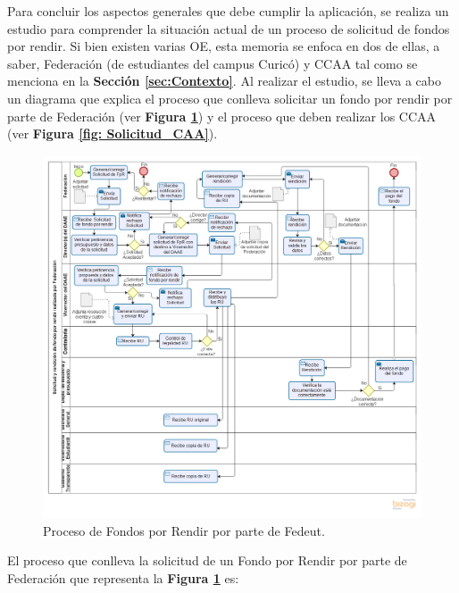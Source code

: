 Para concluir los aspectos generales que debe cumplir la aplicación, se realiza un estudio para comprender la situación actual de un proceso de solicitud de fondos por rendir. Si bien existen varias OE, esta memoria se enfoca en dos de ellas, a saber, Federación (de estudiantes del campus Curicó) y CCAA tal como se menciona en la \textbf{Sección \ref{sec:Contexto}}. Al realizar el estudio, se lleva a cabo un diagrama que explica el proceso que conlleva solicitar un fondo por rendir por parte de Federación (ver \textbf{Figura \ref{fig: Solicitud_Federacion}}) y el proceso que deben realizar los CCAA (ver \textbf{Figura \ref{fig: Solicitud_CAA}}).

\begin{figure}[tb!]
    \hspace{-9mm}
    \includegraphics[width=1.1\textwidth]{Imagenes/Solicitud_Federacion.png}
    \caption{\label{fig: Solicitud_Federacion}Proceso de Fondos por Rendir por parte de Fedeut.}
\end{figure}

El proceso que conlleva la solicitud de un Fondo por Rendir por parte de Federación que representa la \textbf{Figura \ref{fig: Solicitud_Federacion}} es:


